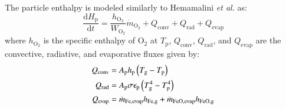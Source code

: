 \documentclass[times,twocolumn,final]{elsarticle}
\newcommand{\mrm}[1]{\mathrm{#1}}
\newcommand{\upd}{\mathrm{d}}                           %
\newcommand{\der}[2]{\frac{\upd #1}{\upd #2}}           %
\begin{document}
{The particle enthalpy is modeled similarly to Hemamalini \emph{et al.} \cite{Hemamalini2024} as:
\begin{equation}
    \der{H_\mrm{p}}{t} = \frac{h_\mrm{O_2}}{W_\mrm{O_2}} \dot{m}_\mrm{O_2} + Q_\mrm{conv} + Q_\mrm{rad} + Q_\mrm{evap} \label{eq:enthalpysimple}
\end{equation}
where $h_\mrm{O_2}$ is the specific enthalpy of $\mrm{O_2}$ at $T_\mrm{p}$, $Q_\mrm{conv}$, $Q_\mrm{rad}$, and $Q_\mrm{evap}$ are the convective, radiative, and evaporative fluxes given by:
\begin{align}
    Q_\mrm{conv} &= A_\mrm{p} h_\mrm{p} \left( T_\mrm{g} - T_\mrm{p} \right) \notag\\
    Q_\mrm{rad} &= A_\mrm{p} \sigma \epsilon_\mrm{p}\left(T_\mrm{g}^4 - T_\mrm{p}^4\right) \label{eq:fluxes}\\
    Q_\mrm{evap} &= \dot{m}_\mrm{Fe,evap} h_\mrm{Fe,g} + \dot{m}_\mrm{FeO,evap} h_\mrm{FeO,g} \notag
\end{align}

}
\end{document}
